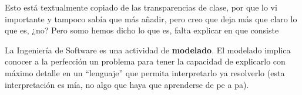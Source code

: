 Esto está textualmente copiado de las transparencias de clase, por que lo vi importante y tampoco sabía que más
añadir, pero creo que deja más que claro lo que es, ¿no? Pero somo hemos dicho lo que es, falta explicar en que
consiste

La Ingeniería de Software es una actividad de \textbf{modelado}. El modelado implica conocer a la perfección un
problema para tener la capacidad de explicarlo con máximo detalle en un ``lenguaje'' que permita interpretarlo ya
resolverlo (esta interpretación es mía, no algo que haya que aprenderse de pe a pa).